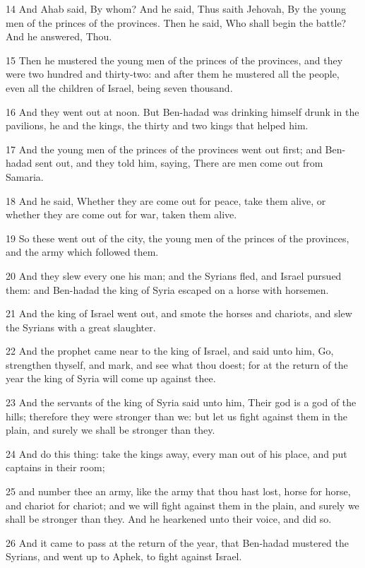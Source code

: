 \par 14 And Ahab said, By whom? And he said, Thus saith Jehovah, By the young men of the princes of the provinces. Then he said, Who shall begin the battle? And he answered, Thou.
\par 15 Then he mustered the young men of the princes of the provinces, and they were two hundred and thirty-two: and after them he mustered all the people, even all the children of Israel, being seven thousand.
\par 16 And they went out at noon. But Ben-hadad was drinking himself drunk in the pavilions, he and the kings, the thirty and two kings that helped him.
\par 17 And the young men of the princes of the provinces went out first; and Ben-hadad sent out, and they told him, saying, There are men come out from Samaria.
\par 18 And he said, Whether they are come out for peace, take them alive, or whether they are come out for war, taken them alive.
\par 19 So these went out of the city, the young men of the princes of the provinces, and the army which followed them.
\par 20 And they slew every one his man; and the Syrians fled, and Israel pursued them: and Ben-hadad the king of Syria escaped on a horse with horsemen.
\par 21 And the king of Israel went out, and smote the horses and chariots, and slew the Syrians with a great slaughter.
\par 22 And the prophet came near to the king of Israel, and said unto him, Go, strengthen thyself, and mark, and see what thou doest; for at the return of the year the king of Syria will come up against thee.
\par 23 And the servants of the king of Syria said unto him, Their god is a god of the hills; therefore they were stronger than we: but let us fight against them in the plain, and surely we shall be stronger than they.
\par 24 And do this thing: take the kings away, every man out of his place, and put captains in their room;
\par 25 and number thee an army, like the army that thou hast lost, horse for horse, and chariot for chariot; and we will fight against them in the plain, and surely we shall be stronger than they. And he hearkened unto their voice, and did so.
\par 26 And it came to pass at the return of the year, that Ben-hadad mustered the Syrians, and went up to Aphek, to fight against Israel.
